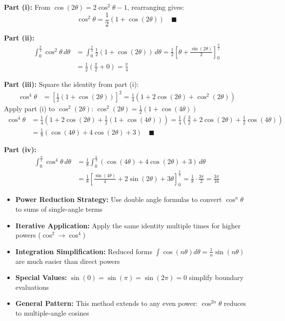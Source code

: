 \begin{solution}
\textbf{Part (i):} From $\cos(2\theta) = 2\cos^2\theta - 1$, rearranging gives:
\[
\cos^2\theta = \boxed{\frac{1}{2}(1 + \cos(2\theta))} \quad \blacksquare
\]

\textbf{Part (ii):}
\begin{align*}
\int_0^{\frac{\pi}{2}} \cos^2\theta \, d\theta &= \int_0^{\frac{\pi}{2}} \frac{1}{2}(1 + \cos(2\theta)) \, d\theta = \frac{1}{2} \left[ \theta + \frac{\sin(2\theta)}{2} \right]_0^{\frac{\pi}{2}} \\
&= \frac{1}{2}\left(\frac{\pi}{2} + 0\right) = \boxed{\frac{\pi}{4}}
\end{align*}

\textbf{Part (iii):} Square the identity from part (i):
\begin{align*}
\cos^4\theta &= \left[\frac{1}{2}(1 + \cos(2\theta))\right]^2 = \frac{1}{4}(1 + 2\cos(2\theta) + \cos^2(2\theta))
\end{align*}
Apply part (i) to $\cos^2(2\theta)$: $\cos^2(2\theta) = \frac{1}{2}(1 + \cos(4\theta))$
\begin{align*}
\cos^4\theta &= \frac{1}{4}\left(1 + 2\cos(2\theta) + \frac{1}{2}(1 + \cos(4\theta))\right) = \frac{1}{4}\left(\frac{3}{2} + 2\cos(2\theta) + \frac{1}{2}\cos(4\theta)\right) \\
&= \boxed{\frac{1}{8}(\cos(4\theta) + 4\cos(2\theta) + 3)} \quad \blacksquare
\end{align*}

\textbf{Part (iv):}
\begin{align*}
\int_0^{\frac{\pi}{2}} \cos^4\theta \, d\theta &= \frac{1}{8} \int_0^{\frac{\pi}{2}} (\cos(4\theta) + 4\cos(2\theta) + 3) \, d\theta \\
&= \frac{1}{8} \left[ \frac{\sin(4\theta)}{4} + 2\sin(2\theta) + 3\theta \right]_0^{\frac{\pi}{2}} = \frac{1}{8} \cdot \frac{3\pi}{2} = \boxed{\frac{3\pi}{16}}
\end{align*}
\end{solution}

\begin{takeaways}
\begin{itemize}
\item \textbf{Power Reduction Strategy:} Use double angle formulas to convert $\cos^n\theta$ to sums of single-angle terms
\item \textbf{Iterative Application:} Apply the same identity multiple times for higher powers ($\cos^2 \to \cos^4$)
\item \textbf{Integration Simplification:} Reduced forms $\int \cos(n\theta)d\theta = \frac{1}{n}\sin(n\theta)$ are much easier than direct powers
\item \textbf{Special Values:} $\sin(0) = \sin(\pi) = \sin(2\pi) = 0$ simplify boundary evaluations
\item \textbf{General Pattern:} This method extends to any even power: $\cos^{2n}\theta$ reduces to multiple-angle cosines
\end{itemize}
\end{takeaways}
